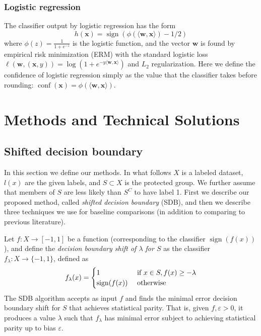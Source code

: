 \documentclass[twoside,leqno,twocolumn]{article}
\DeclareMathOperator{\sign}{sign}
\DeclareMathOperator{\conf}{conf}
\begin{document}
\subsubsection{Logistic regression}
The classifier output by logistic regression has the form $$h(\mathbf
x)=\sign(\phi(\langle \mathbf w, \mathbf x\rangle) - 1/2)$$ where
$\phi(z)=\frac{1}{1+e^{-z}}$ is the logistic function, and the vector $\mathbf
w$ is found by empirical risk minimization (ERM) with the standard logistic
loss $\ell(\mathbf w, (\mathbf x,y))=\log(1+e^{-y\langle \mathbf w, \mathbf
x\rangle})$ and $L_2$ regularization. Here we define the confidence of logistic
regression simply as the value that the classifier takes before rounding:
$\conf(\mathbf x) = \phi(\langle \mathbf w, \mathbf x\rangle).$

\section{Methods and Technical Solutions} \label{sec:methods}

\subsection{Shifted decision boundary}

In this section we define our methods. In what follows $X$ is a labeled
dataset, $l(x)$ are the given labels, and $S \subset X$ is the protected group.
We further assume that members of $S$ are less likely than $S^C$ to have label
1. First we describe our proposed method, called \emph{shifted decision
boundary} (SDB), and then we describe three techniques we use for baseline
comparisons (in addition to comparing to previous literature).

Let $f:X \to [-1,1]$ be a function (corresponding to the classifier
$\sign(f(x))$), and define the \emph{decision boundary shift of $\lambda$ for
$S$} as the classifier $f_\lambda: X \to \{-1,1\}$, defined as
$$
f_\lambda(x) = \begin{cases}
1    & \textup{ if } x \in S, f(x) \geq -\lambda \\ 
\sign(f(x)) & \textup{ otherwise }
\end{cases}
$$
The SDB algorithm accepts as input $f$ and finds the minimal error
decision boundary shift for $S$ that achieves statistical parity. That is,
given $f,\varepsilon > 0$, it produces a value $\lambda$ such that $f_\lambda$
has minimal error subject to achieving statistical parity up to bias
$\varepsilon$. 
\end{document}
